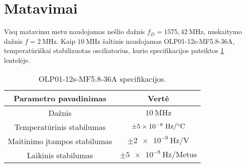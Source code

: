 \documentclass[../gnss_interference_resistant_thesis.tex]{subfiles}
\begin{document}
\section{Matavimai}

Visų matavimu metu naudojamas nešlio dažnis
$f_D = 1575,42\ \mathrm{MHz}$, nuskaitymo dažnis $f = 2\ \mathrm{MHz}$.
Kaip $10\ \mathrm{MHz}$ šaltinis
naudojamas OLP01-12s-MF5.8-36A, temperatūriškai stabilizuotas osciliatorius,
kurio specifikacijos pateiktos \ref{tab:clock_source_spec} lentelėje.


\begin{table}[h]
    \protect\caption{\label{tab:clock_source_spec}OLP01-12s-MF5.8-36A specifikacijos.}
    \centering{}%
    \begin{tabular}{| c | c |}
    \hline
    Parametro pavadinimas & Vertė \\
    \hline
    Dažnis                         & $10\ \mathrm{MHz}$ \\
    Temperatūrinis stabilumas      & $\pm \num{5e-8}\ \mathrm{Hz/\degree C}$ \\
    Maitinimo įtampos stabilumas   & $\pm \num{2e-9}\ \mathrm{Hz/V}$ \\
    Laikinis stabilumas             & $\pm \num{5e-8}\ \mathrm{Hz/Metus}$ \\
    \hline
    \end{tabular}
\end{table}







\end{document}
